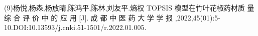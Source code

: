 \documentclass[preview]{standalone}
\begin{document}
\begin{center}
(9)杨悦,杨森,杨放晴,陈鸿平,陈林,刘友平.熵权 TOPSIS 模型在竹叶花椒药材质 量 综 合 评 价 中 的 应 用 [J]. 成 都 中 医 药 大 学 学 报 ,2022,45(01):5-10.DOI:10.13593/j.cnki.51-1501/r.2022.01.005.
\end{center}
\end{document}
